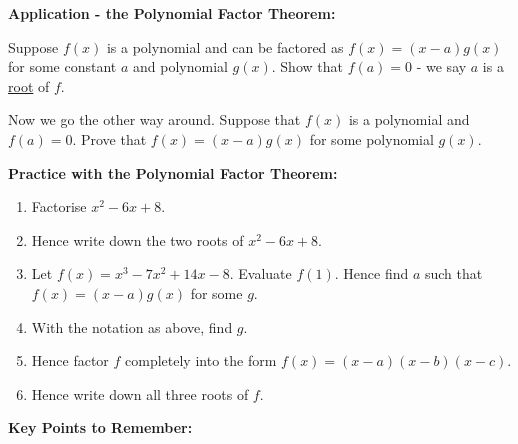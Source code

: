 \documentclass{article}
\begin{document}
\clearpage

{\bf Application - the Polynomial Factor Theorem:}

\vspace{5mm}

Suppose $f(x)$ is a polynomial and can be factored as $f(x)=(x-a)g(x)$ for some constant $a$ and polynomial $g(x)$. Show that $f(a)=0$ - we say $a$ is a \underline{root} of $f$.

\vfill

Now we go the other way around. Suppose that $f(x)$ is a polynomial and $f(a)=0$. Prove that $f(x)=(x-a)g(x)$ for some polynomial $g(x)$.

\vfill
\clearpage

{\bf Practice with the Polynomial Factor Theorem:}

\vspace{5mm}

\begin{enumerate}
\item Factorise $x^2-6x+8$.
\item Hence write down the two roots of $x^2-6x+8$.
\item Let $f(x)=x^3-7x^2+14x-8$. Evaluate $f(1)$. Hence find $a$ such that $f(x)=(x-a)g(x)$ for some $g$.
\item With the notation as above, find $g$.
\item Hence factor $f$ completely into the form $f(x)=(x-a)(x-b)(x-c)$.
\item Hence write down all three roots of $f$.
\end{enumerate}


\clearpage

{\bf Key Points to Remember:}

\vspace{5mm}
\end{document}

